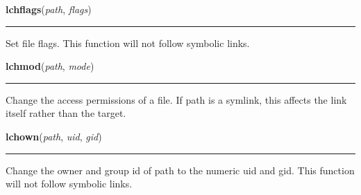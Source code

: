     \label{os:lchflags}

    \vspace{0.5ex}

\hspace{.8\funcindent}\begin{boxedminipage}{\funcwidth}

    \raggedright \textbf{lchflags}(\textit{path}, \textit{flags})

    \vspace{-1.5ex}

    \rule{\textwidth}{0.5\fboxrule}
\setlength{\parskip}{2ex}
    Set file flags. This function will not follow symbolic links.

\setlength{\parskip}{1ex}
    \end{boxedminipage}

    \label{os:lchmod}

    \vspace{0.5ex}

\hspace{.8\funcindent}\begin{boxedminipage}{\funcwidth}

    \raggedright \textbf{lchmod}(\textit{path}, \textit{mode})

    \vspace{-1.5ex}

    \rule{\textwidth}{0.5\fboxrule}
\setlength{\parskip}{2ex}
    Change the access permissions of a file. If path is a symlink, this 
    affects the link itself rather than the target.

\setlength{\parskip}{1ex}
    \end{boxedminipage}

    \label{os:lchown}

    \vspace{0.5ex}

\hspace{.8\funcindent}\begin{boxedminipage}{\funcwidth}

    \raggedright \textbf{lchown}(\textit{path}, \textit{uid}, \textit{gid})

    \vspace{-1.5ex}

    \rule{\textwidth}{0.5\fboxrule}
\setlength{\parskip}{2ex}
    Change the owner and group id of path to the numeric uid and gid. This 
    function will not follow symbolic links.

\setlength{\parskip}{1ex}
    \end{boxedminipage}

